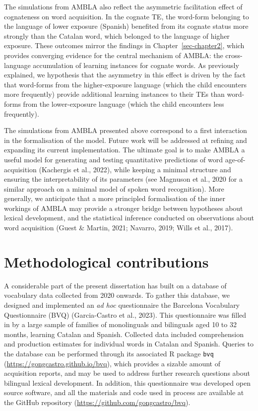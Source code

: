 \documentclass[
  12pt,
  b5paperpaper,
  twoside]{scrreprt}
\begin{document}
The simulations from AMBLA also reflect the asymmetric facilitation
effect of cognateness on word acquisition. In the cognate TE, the
word-form belonging to the language of lower exposure (Spanish)
benefited from its cognate status more strongly than the Catalan word,
which belonged to the language of higher exposure. These outcomes mirror
the findings in Chapter~\ref{sec-chapter2}, which provides converging
evidence for the central mechanism of AMBLA: the cross-language
accumulation of learning instances for cognate words. As previously
explained, we hypothesis that the asymmetry in this effect is driven by
the fact that word-forms from the higher-exposure language (which the
child encounters more frequently) provide additional learning instances
to their TEs than word-forms from the lower-exposure language (which the
child encounters less frequently).

The simulations from AMBLA presented above correspond to a first
interaction in the formalisation of the model. Future work will be
addressed at refining and expanding its current implementation. The
ultimate goal is to make AMBLA a useful model for generating and testing
quantitative predictions of word age-of-acquisition (Kachergis et al.,
2022), while keeping a minimal structure and ensuring the
interpretability of its parameters (see Magnuson et al., 2020 for a
similar approach on a minimal model of spoken word recognition). More
generally, we anticipate that a more principled formalisation of the
inner workings of AMBLA may provide a stronger bridge between hypotheses
about lexical development, and the statistical inference conducted on
observations about word acquisition (Guest \& Martin, 2021; Navarro,
2019; Wills et al., 2017).

\hypertarget{methodological-contributions}{%
\section{Methodological
contributions}\label{methodological-contributions}}

A considerable part of the present dissertation has built on a database
of vocabulary data collected from 2020 onwards. To gather this database,
we designed and implemented an \emph{ad hoc} questionnaire the Barcelona
Vocabulary Questionnaire (BVQ) (Garcia-Castro et al., 2023). This
questionnaire was filled in by a large sample of families of
monolinguals and bilinguals aged 10 to 32 months, learning Catalan and
Spanish. Collected data included comprehension and production estimates
for individual words in Catalan and Spanish. Queries to the database can
be performed through its associated R package \texttt{bvq}
(\url{https://gongcastro.github.io/bvq}), which provides a sizable
amount of acquisition reports, and may be used to address further
research questions about bilingual lexical development. In addition,
this questionnaire was developed open source software, and all the
materials and code used in process are available at the GitHub
repository (\url{https://github.com/gongcastro/bvq}).
\end{document}
